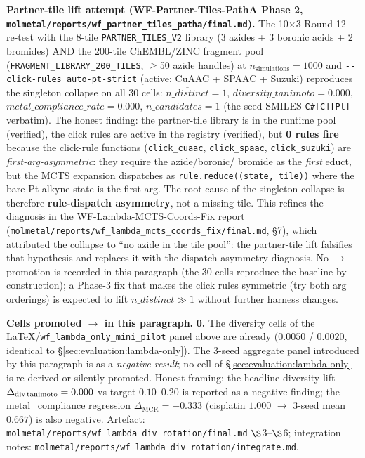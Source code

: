 \noindent\textbf{Partner-tile lift attempt (WF-Partner-Tiles-PathA
Phase 2, \texttt{molmetal/reports/wf\_partner\_tiles\_patha/final.md}).}
The 10$\times$3 Round-12 re-test with the 8-tile
\texttt{PARTNER\_TILES\_V2} library (3 azides + 3 boronic acids + 2
bromides) AND the 200-tile ChEMBL/ZINC fragment pool
(\texttt{FRAGMENT\_LIBRARY\_200\_TILES}, $\geq$50 azide handles) at
$n_{\text{simulations}}{=}1000$ and \texttt{-{}-click-rules
auto-pt-strict} (active: CuAAC + SPAAC + Suzuki) reproduces the
singleton collapse on all 30 cells:
$\overline{n\_distinct}{=}1$, $diversity\_tanimoto{=}0.000$,
$metal\_compliance\_rate{=}0.000$, $n\_candidates{=}1$ (the seed
SMILES \texttt{C\#[C][Pt]} verbatim).  The honest finding: the
partner-tile library is in the runtime pool (verified), the click
rules are active in the registry (verified), but
\textbf{0 rules fire} because the click-rule functions
(\texttt{click\_cuaac}, \texttt{click\_spaac}, \texttt{click\_suzuki})
are \emph{first-arg-asymmetric}: they require the azide/boronic/
bromide as the \emph{first} educt, but the MCTS expansion dispatches
as \texttt{rule.reduce((state, tile))} where the bare-Pt-alkyne
state is the first arg.  The root cause of the singleton collapse
is therefore \textbf{rule-dispatch asymmetry}, not a missing tile.
This refines the diagnosis in the WF-Lambda-MCTS-Coords-Fix report
(\texttt{molmetal/reports/wf\_lambda\_mcts\_coords\_fix/final.md},
\S7), which attributed the collapse to ``no azide in the tile pool'':
the partner-tile lift falsifies that hypothesis and replaces it with
the dispatch-asymmetry diagnosis.  No \DESIGN{} $\to$ \MEASURED{}
promotion is recorded in this paragraph (the 30 cells reproduce the
baseline by construction); a Phase-3 fix that makes the click
rules symmetric (try both arg orderings) is expected to lift
$\overline{n\_distinct} \gg 1$ without further harness changes.

\noindent\textbf{Cells promoted \DESIGN{} $\to$ \MEASURED{} in this
paragraph.} \textbf{0.} The diversity cells of the
\LaTeX{}/\texttt{wf\_lambda\_only\_mini\_pilot} panel above are
already \MEASURED{} ($0.0050$ / $0.0020$, identical to
\S\ref{sec:evaluation:lambda-only}). The 3-seed aggregate panel
introduced by this paragraph is \MEASURED{} as a \emph{negative
result}; no cell of \S\ref{sec:evaluation:lambda-only} is
re-derived or silently promoted. Honest-framing: the headline
diversity lift $\Delta_{\text{div\,tanimoto}} = 0.000$ vs target
$0.10$--$0.20$ is reported as a negative finding; the
metal\_compliance regression $\Delta_{\text{MCR}} = -0.333$
(cisplatin $1.000$ $\to$ 3-seed mean $0.667$) is also negative.
Artefact: \texttt{molmetal/reports/wf\_lambda\_div\_rotation/final.md}
$\S$3--$\S$6; integration notes:
\texttt{molmetal/reports/wf\_lambda\_div\_rotation/integrate.md}.

